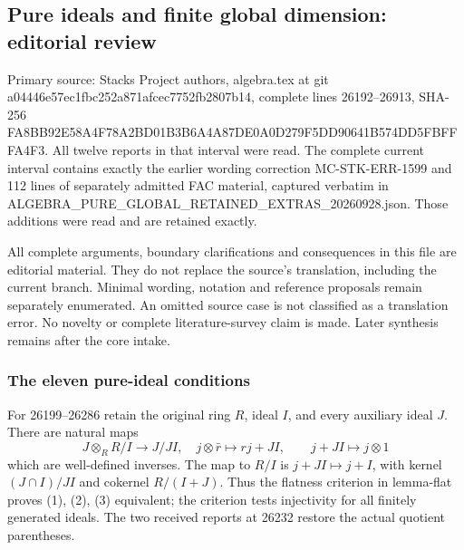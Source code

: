 \subsection{Pure ideals and finite global dimension: editorial review}\label{algebra-proof-022-pure-ideals-and-finite-global-dimension-editorial-review}

Primary source: Stacks Project authors, algebra.tex at git a044\allowbreak{}46e5\allowbreak{}7ec1\allowbreak{}fbc2\allowbreak{}52a8\allowbreak{}71af\allowbreak{}cec7\allowbreak{}752f\allowbreak{}b280\allowbreak{}7b14, complete lines 26192--26913, SHA-256 FA8B\allowbreak{}B92E\allowbreak{}58A4\allowbreak{}F78A\allowbreak{}2BD0\allowbreak{}1B3B\allowbreak{}6A4A\allowbreak{}87DE\allowbreak{}0A0D\allowbreak{}279F\allowbreak{}5DD9\allowbreak{}0641\allowbreak{}B574\allowbreak{}DD5F\allowbreak{}BFFF\allowbreak{}A4F3. All twelve reports in that interval were read. The complete current interval contains exactly the earlier wording correction MC-\AlgebraIdentifierBreak{}STK-\AlgebraIdentifierBreak{}ERR-\AlgebraIdentifierBreak{}1599 and 112 lines of separately admitted FAC material, captured verbatim in ALGEBRA\_\allowbreak{}PURE\_\allowbreak{}GLOBAL\_\allowbreak{}RETAINED\_\allowbreak{}EXTRAS\_\allowbreak{}20260928.\allowbreak{}json. Those additions were read and are retained exactly.

All complete arguments, boundary clarifications and consequences in this file are editorial material. They do not replace the source's translation, including the current branch. Minimal wording, notation and reference proposals remain separately enumerated. An omitted source case is not classified as a translation error. No novelty or complete literature-survey claim is made. Later synthesis remains after the core intake.

\subsubsection{The eleven pure-ideal conditions}\label{algebra-proof-022-the-eleven-pure-ideal-conditions}

For 26199--26286 retain the original ring \(R\), ideal \(I\), and every auxiliary ideal \(J\). There are natural maps \[
J\otimes_RR/I\longrightarrow J/JI,\quad j\otimes\bar r\mapsto rj+JI,
\qquad j+JI\longmapsto j\otimes1
\] which are well-defined inverses. The map to \(R/I\) is \(j+JI\mapsto j+I\), with kernel \((J\cap I)/JI\) and cokernel \(R/(I+J)\). Thus the flatness criterion in lemma-flat proves (1), (2), (3) equivalent; the criterion tests injectivity for all finitely generated ideals. The two received reports at 26232 restore the actual quotient parentheses.

